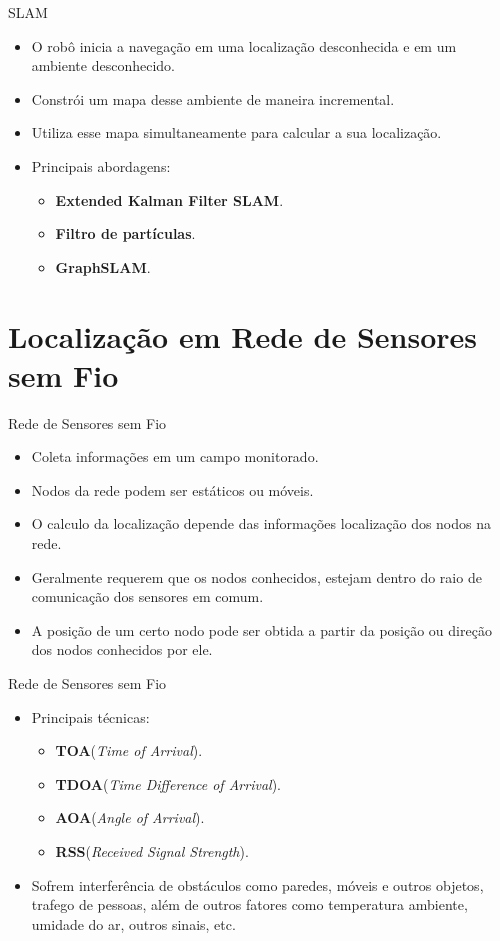 \documentclass{beamer}
\newlength{\wideitemsep}
\let\olditem\item
\renewcommand{\item}{\setlength{\itemsep}{\wideitemsep}\olditem}
\begin{document}
\begin{frame}{SLAM}
\begin{itemize}
  \item O robô inicia a navegação em uma localização desconhecida e em um ambiente desconhecido.
  \item Constrói um mapa desse ambiente de maneira incremental.
  \item Utiliza esse mapa simultaneamente para calcular a sua localização.
  \item Principais abordagens:
  \begin{itemize}
  \item \textbf{Extended Kalman Filter SLAM}. 
  \item \textbf{Filtro de partículas}.
  \item \textbf{GraphSLAM}.
  \end{itemize}
\end{itemize}
\end{frame}

\section{Localização em Rede de Sensores sem Fio} %

\begin{frame}{Rede de Sensores sem Fio}
\begin{itemize}
 \item Coleta informações em um campo monitorado.
 \item Nodos da rede podem ser estáticos ou móveis.
 \item O calculo da localização depende das informações localização dos nodos na rede.
 \item Geralmente requerem que os nodos conhecidos, estejam dentro 
	do raio de comunicação dos sensores em comum.
  \item A posição de um certo nodo pode ser obtida 
  a partir da posição ou direção dos nodos conhecidos por ele.
\end{itemize}
\end{frame}

\begin{frame}{Rede de Sensores sem Fio}
\begin{itemize}
  \item Principais técnicas:
    \begin{itemize}
     \item \textbf{TOA}(\textit{Time of Arrival}).
     \item \textbf{TDOA}(\textit{Time Difference of Arrival}).
     \item \textbf{AOA}(\textit{Angle of Arrival}).
     \item \textbf{RSS}(\textit{Received Signal Strength}).
    \end{itemize}

 \item Sofrem interferência de obstáculos como paredes, 
   móveis e outros objetos, trafego de pessoas, além de outros fatores como temperatura ambiente, 
   umidade do ar, outros sinais, etc.
\end{itemize}
\end{frame}
\end{document}

